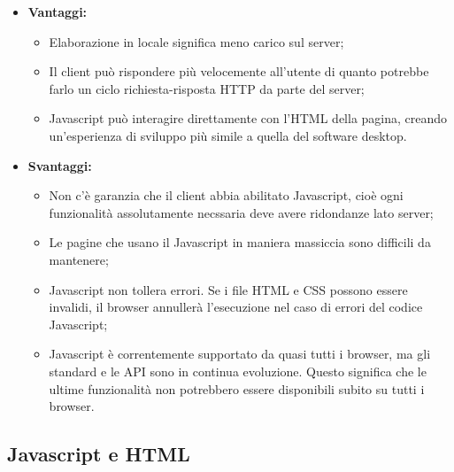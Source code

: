 \documentclass[a4paper,11pt]{article}
\begin{document}
\begin{itemize}
	\item \textbf{Vantaggi:}
		\begin{itemize}
			\item Elaborazione in locale significa meno carico sul server;
			\item Il client può rispondere più velocemente all'utente di quanto potrebbe farlo un ciclo richiesta-risposta HTTP da parte del server;
			\item Javascript può interagire direttamente con l'HTML della pagina, creando un'esperienza di sviluppo più simile a quella del software desktop.
		\end{itemize}
	\item \textbf{Svantaggi:}
		\begin{itemize}
			\item Non c'è garanzia che il client abbia abilitato Javascript, cioè ogni funzionalità assolutamente necssaria deve avere ridondanze lato server;
			\item Le pagine che usano il Javascript in maniera massiccia sono difficili da mantenere;
			\item Javascript non tollera errori. Se i file HTML e CSS possono essere invalidi, il browser annullerà l'esecuzione nel caso di errori del codice Javascript;
			\item Javascript è correntemente supportato da quasi tutti i browser, ma gli standard e le API sono in continua evoluzione. Questo significa che le ultime funzionalità non potrebbero essere disponibili subito su tutti i browser.
		\end{itemize}
\end{itemize}

\subsection{Javascript e HTML}
\end{document}
